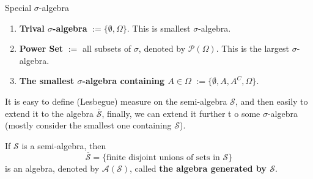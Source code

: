 


\begin{example}{Special $\sigma$-algebra}{}
    \begin{enumerate}
        \item \textbf{Trival $\sigma$-algebra} $:=\{\emptyset,\Omega\}$. This is smallest $\sigma$-algebra.
        \item \textbf{Power Set} $:=$ all subsets of $\sigma$, denoted by $\mathcal{P}(\Omega)$. This is the largest $\sigma$-algebra.
        \item \textbf{The smallest $\sigma$-algebra containing $A\in\Omega$} $:=\{\emptyset,A,A^C,\Omega\}$.
    \end{enumerate}
\end{example}

It is easy to define (Lesbegue) measure on the semi-algebra  $\mathcal{S}$, and then easily to extend it to the algebra $\overline{\mathcal{S}}$, finally, we can extend it further t o some $\sigma$-algebra (mostly consider the smallest one containing $\mathcal{S}$).

\begin{lemma}{}{}
    If $\mathcal{S}$ is a semi-algebra, then $$\overline{\mathcal{S}}=\{\text{finite disjoint unions of sets in }\mathcal{S}\}$$ is an algebra, denoted by $\mathcal{A}(\mathcal{S})$, called \textbf{the algebra generated by $\mathcal{S}$}.
\end{lemma}

